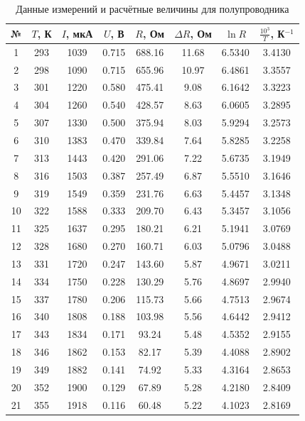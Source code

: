 \documentclass[a4paper,14pt]{article}
\begin{document}
\begin{table}[H]
\centering
\caption{Данные измерений и расчётные величины для полупроводника}
\label{tab:semi}
\small
\begin{tabular}{|c|c|c|c|c|c|c|c|}
\hline
№ & $T$, К & $I$, мкА & $U$, В & $R$, Ом & $\Delta R$, Ом & $\ln R$ & $\tfrac{10^3}{T}$, К$^{-1}$ \\
\hline
1  & 293 & 1039 & 0.715 & 688.16 & 11.68 & 6.5340 & 3.4130 \\
2  & 298 & 1090 & 0.715 & 655.96 & 10.97 & 6.4861 & 3.3557 \\
3  & 301 & 1220 & 0.580 & 475.41 &  9.08 & 6.1642 & 3.3223 \\
4  & 304 & 1260 & 0.540 & 428.57 &  8.63 & 6.0605 & 3.2895 \\
5  & 307 & 1330 & 0.500 & 375.94 &  8.03 & 5.9294 & 3.2573 \\
6  & 310 & 1383 & 0.470 & 339.84 &  7.64 & 5.8285 & 3.2258 \\
7  & 313 & 1443 & 0.420 & 291.06 &  7.22 & 5.6735 & 3.1949 \\
8  & 316 & 1503 & 0.387 & 257.49 &  6.87 & 5.5510 & 3.1646 \\
9  & 319 & 1549 & 0.359 & 231.76 &  6.63 & 5.4457 & 3.1348 \\
10 & 322 & 1588 & 0.333 & 209.70 &  6.43 & 5.3457 & 3.1056 \\
11 & 325 & 1637 & 0.295 & 180.21 &  6.21 & 5.1941 & 3.0769 \\
12 & 328 & 1680 & 0.270 & 160.71 &  6.03 & 5.0796 & 3.0488 \\
13 & 331 & 1720 & 0.247 & 143.60 &  5.87 & 4.9671 & 3.0211 \\
14 & 334 & 1750 & 0.228 & 130.29 &  5.76 & 4.8697 & 2.9940 \\
15 & 337 & 1780 & 0.206 & 115.73 &  5.66 & 4.7513 & 2.9674 \\
16 & 340 & 1808 & 0.188 & 103.98 &  5.56 & 4.6442 & 2.9412 \\
17 & 343 & 1834 & 0.171 &  93.24 &  5.48 & 4.5352 & 2.9155 \\
18 & 346 & 1862 & 0.153 &  82.17 &  5.39 & 4.4088 & 2.8902 \\
19 & 349 & 1882 & 0.141 &  74.92 &  5.33 & 4.3164 & 2.8653 \\
20 & 352 & 1900 & 0.129 &  67.89 &  5.28 & 4.2180 & 2.8409 \\
21 & 355 & 1918 & 0.116 &  60.48 &  5.22 & 4.1023 & 2.8169 \\
\hline
\end{tabular}
\end{table}
\end{document}
